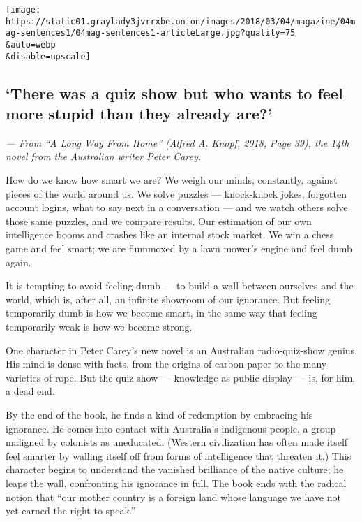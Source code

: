 \texttt{[image: https://static01.graylady3jvrrxbe.onion/images/2018/03/04/magazine/04mag-sentences1/04mag-sentences1-articleLarge.jpg?quality=75\\\&auto=webp\\\&disable=upscale]}

\hypertarget{there-was-a-quiz-show-but-who-wants-to-feel-more-stupid-than-they-already-are}{%
\subsection{`There was a quiz show but who wants to feel more stupid
than they already
are?'}\label{there-was-a-quiz-show-but-who-wants-to-feel-more-stupid-than-they-already-are}}

\emph{--- From ``A Long Way From Home'' (Alfred A. Knopf, 2018, Page
39), the 14th novel from the Australian writer Peter Carey.}

How do we know how smart we are? We weigh our minds, constantly, against
pieces of the world around us. We solve puzzles --- knock-knock jokes,
forgotten account logins, what to say next in a conversation --- and we
watch others solve those same puzzles, and we compare results. Our
estimation of our own intelligence booms and crashes like an internal
stock market. We win a chess game and feel smart; we are flummoxed by a
lawn mower's engine and feel dumb again.

It is tempting to avoid feeling dumb --- to build a wall between
ourselves and the world, which is, after all, an infinite showroom of
our ignorance. But feeling temporarily dumb is how we become smart, in
the same way that feeling temporarily weak is how we become strong.

One character in Peter Carey's new novel is an Australian
radio-quiz-show genius. His mind is dense with facts, from the origins
of carbon paper to the many varieties of rope. But the quiz show ---
knowledge as public display --- is, for him, a dead end.

By the end of the book, he finds a kind of redemption by embracing his
ignorance. He comes into contact with Australia's indigenous people, a
group maligned by colonists as uneducated. (Western civilization has
often made itself feel smarter by walling itself off from forms of
intelligence that threaten it.) This character begins to understand the
vanished brilliance of the native culture; he leaps the wall,
confronting his ignorance in full. The book ends with the radical notion
that ``our mother country is a foreign land whose language we have not
yet earned the right to speak.''


